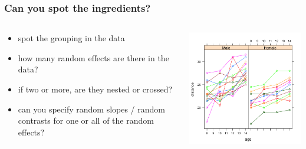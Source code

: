 \documentclass{beamer}
\begin{document}
\begin{frame}
    \frametitle{Can you spot the ingredients?}
    \begin{columns}
        \begin{column}{0.5\textwidth}
            \begin{itemize}
                \item spot the grouping in the data
                \item how many random effects are there in the data?
                \item if two or more, are they nested or crossed?
                \item can you specify random slopes / random contrasts for one or all of the random effects?
            \end{itemize}
        \end{column}
        \begin{column}{0.5\textwidth}
            \includegraphics[width=\textwidth]{lectures/day_6_praxis_and_fitting_of_mems/figures/unnamed-chunk-14-1.png}
        \end{column}
    \end{columns}
\end{frame}
\end{document}
